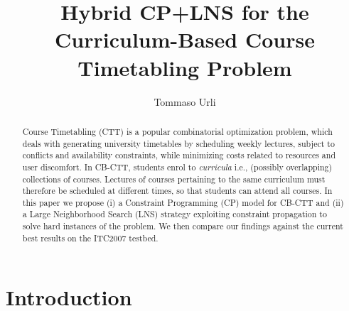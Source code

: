 \documentclass{llncs}
\begin{document}
\title{Hybrid CP+LNS for the Curriculum-Based Course Timetabling Problem}

\author{Tommaso Urli\inst{}}

\maketitle

\begin{abstract}

Course Timetabling (CTT) \cite{Scha99} is a popular combinatorial optimization problem, which deals with generating university timetables by scheduling weekly lectures, subject to conflicts and availability constraints, while minimizing costs related to resources and user discomfort. 
In CB-CTT, students enrol to \emph{curricula} i.e., (possibly overlapping) collections of courses. Lectures of courses pertaining to the same curriculum must therefore be scheduled at different times, so that students can attend all courses. 
%
In this paper we propose (i) a Constraint Programming (CP) model for CB-CTT and (ii) a Large Neighborhood Search (LNS) \cite{Pisinger2010} strategy exploiting constraint propagation to solve hard instances of the problem. 
We then compare our findings against the current best results on the ITC2007 \cite{DiMS07} testbed. 

\end{abstract}

\section{Introduction}\label{sec:introduction}
\end{document}
